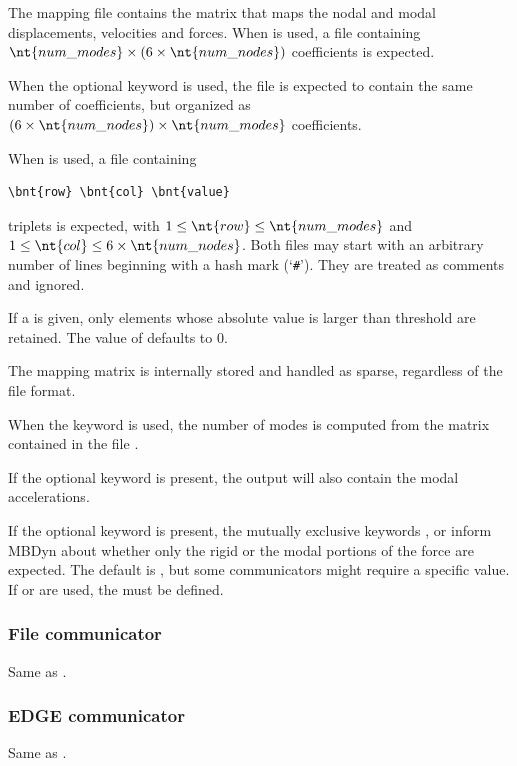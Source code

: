 The mapping file contains the matrix that maps the nodal and modal
displacements, velocities and forces.
When  is used, a file containing
$\nt{num\_modes} \times (6\times\nt{num\_nodes})$ coefficients is expected.

When the optional  keyword is used, the file is expected to contain
the same number of coefficients, but organized as $(6\times\nt{num\_nodes}) \times \nt{num\_modes}$ coefficients.

When  is used, a file containing
\begin{Verbatim}[commandchars=\\\{\}]
\bnt{row} \bnt{col} \bnt{value}
\end{Verbatim}
triplets is expected, with $1 \le \nt{row} \le \nt{num\_modes}$
and $1 \le \nt{col} \le 6\times\nt{num\_nodes}$.
Both files may start with an arbitrary number of lines beginning
with a hash mark (`\texttt{\#}').
They are treated as comments and ignored.

If a  is given, only elements whose absolute value
is larger than threshold are retained.
The value of  defaults to 0.

The mapping matrix is internally stored and handled as sparse,
regardless of the file format.

When the keyword  is used, the number of modes 
is computed from the matrix contained in the file .

If the optional keyword  is present,
the output will also contain the modal accelerations.

If the optional keyword  is present,
the mutually exclusive keywords ,  or 
inform MBDyn about whether only the rigid or the modal portions
of the force are expected.
The default is , but some communicators might require
a specific value.
If  or  are used, the  must be defined.



\subsubsection{File communicator}
Same as .

\subsubsection{EDGE communicator}
Same as .

